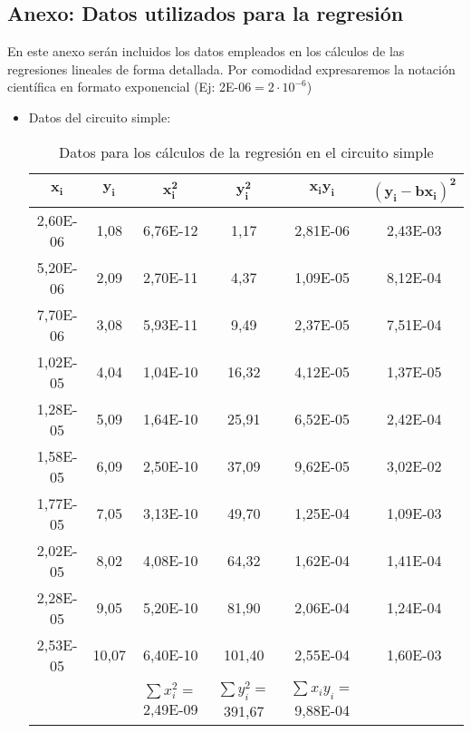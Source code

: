 \documentclass[a4paper,12pt,titlepage]{article}
\begin{document}
\subsection{Anexo: Datos utilizados para la regresión}
En este anexo serán incluidos los datos empleados en los cálculos de las regresiones lineales de forma detallada. Por comodidad expresaremos la notación científica  en formato exponencial (Ej: 2E-06$=2\cdot 10^{-6}$) 
\begin{itemize}
    \item Datos del circuito simple:
    \begin{table}[h!]
        \centering
        \begin{tabular}{|c|c|c|c|c|c|}
        \hline
        $\mathbf{x_{i}}$ & $\mathbf{y_{i}}$ & $\mathbf{x_ {i}^2}$ & $\mathbf{y_{i}^2}$ & $\mathbf{x_{i}y_{i}}$  & $\mathbf{(y_{i}-bx_{i})^2}$ \\ \hline
        2,60E-06 & 1,08  & 6,76E-12   & 1,17   & 2,81E-06 & 2,43E-03 \\ \hline
        5,20E-06 & 2,09  & 2,70E-11  & 4,37   & 1,09E-05 & 8,12E-04 \\ \hline
        7,70E-06 & 3,08  & 5,93E-11  & 9,49   & 2,37E-05 & 7,51E-04 \\ \hline
        1,02E-05 & 4,04  & 1,04E-10 & 16,32  & 4,12E-05 & 1,37E-05 \\ \hline
        1,28E-05 & 5,09  & 1,64E-10 & 25,91  & 6,52E-05 & 2,42E-04 \\ \hline
        1,58E-05 & 6,09  & 2,50E-10 & 37,09  & 9,62E-05 & 3,02E-02 \\ \hline
        1,77E-05 & 7,05  & 3,13E-10 & 49,70  & 1,25E-04 & 1,09E-03 \\ \hline
        2,02E-05 & 8,02  & 4,08E-10 & 64,32  & 1,62E-04 & 1,41E-04 \\ \hline
        2,28E-05 & 9,05  & 5,20E-10 & 81,90  & 2,06E-04 & 1,24E-04 \\ \hline
        2,53E-05 & 10,07 & 6,40E-10 & 101,40 & 2,55E-04 & 1,60E-03 \\ \hline
            &       & $\sum x_{i}^2=$2,49E-09 & $\sum y_{i}^2=$391,67  & $\sum x_{i}y_{i}=$9,88E-04 &          \\ \hline
        \end{tabular}
        \caption{Datos para los cálculos de la regresión en el circuito simple}
        \label{tab:my-table}
    \end{table}


\end{itemize}
\end{document}
